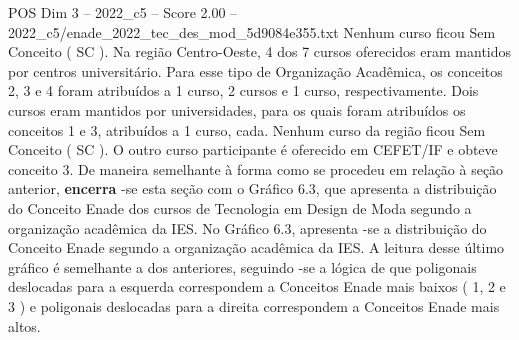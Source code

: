 \begin{textsample}{POS Dim 3 – 2022\_c5 – Score 2.00 – 2022\_c5/enade\_2022\_tec\_des\_mod\_5d9084e355.txt}
Nenhum curso ficou Sem Conceito ( SC ).
Na região Centro-Oeste, 4 dos 7 cursos oferecidos eram mantidos por centros universitário.
Para esse tipo de Organização Acadêmica, os conceitos 2, 3 e 4 foram atribuídos a 1 curso, 2 cursos e 1 curso, respectivamente.
Dois cursos eram mantidos por universidades, para os quais foram atribuídos os conceitos 1 e 3, atribuídos a 1 curso, cada.
Nenhum curso da região ficou Sem Conceito ( SC ).
O outro curso participante é oferecido em CEFET/IF e obteve conceito 3.
De maneira semelhante à forma como se procedeu em relação à seção anterior, \textbf{encerra} -se esta seção com o Gráfico 6.3, que apresenta a distribuição do Conceito Enade dos cursos de Tecnologia em Design de Moda segundo a organização acadêmica da IES.
No Gráfico 6.3, apresenta -se a distribuição do Conceito Enade segundo a organização acadêmica da IES.
A leitura desse último gráfico é semelhante a dos anteriores, seguindo -se a lógica de que poligonais deslocadas para a esquerda correspondem a Conceitos Enade mais baixos ( 1, 2 e 3 ) e poligonais deslocadas para a direita correspondem a Conceitos Enade mais altos.

\end{textsample}

